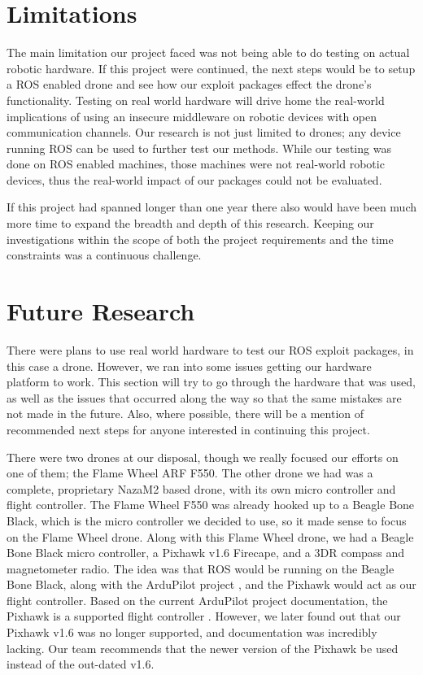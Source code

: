 \documentclass[IEEEtran,letterpaper,10pt,notitlepage,draftclsnofoot]{article}
\begin{document}
\section{Limitations}
The main limitation our project faced was not being able to do testing on actual robotic hardware.
If this project were continued, the next steps would be to setup a ROS enabled drone and see how our exploit packages effect the drone's functionality.
Testing on real world hardware will drive home the real-world implications of using an insecure middleware on robotic devices with open communication channels.
Our research is not just limited to drones; any device running ROS can be used to further test our methods.
While our testing was done on ROS enabled machines, those machines were not real-world robotic devices, thus the real-world impact of our packages could not be evaluated.

If this project had spanned longer than one year there also would have been much more time to expand the breadth and depth of this research.
Keeping our investigations within the scope of both the project requirements and the time constraints was a continuous challenge.

\section{Future Research}


There were plans to use real world hardware to test our ROS exploit packages, in this case a drone. However,
we ran into some issues getting our hardware platform to work. This section will try to go through the
hardware that was used, as well as the issues that occurred along the way so that the same mistakes are not
made in the future. Also, where possible, there will be a mention of recommended next steps for anyone
interested in continuing this project.

There were two drones at our disposal, though we really focused our efforts on one of them; the Flame Wheel ARF F550. The other drone we had was a complete, proprietary NazaM2 based drone, with its own micro controller
and flight controller. The Flame Wheel F550 was already hooked up to a Beagle Bone Black, which is the
micro controller we decided to use, so it made sense to focus on the Flame Wheel drone. Along with this
Flame Wheel drone, we had a Beagle Bone Black micro controller, a Pixhawk v1.6 Firecape, and a 3DR compass and
magnetometer radio. The idea was that ROS would be running on the Beagle Bone Black, along with the ArduPilot
project \cite{Ardu}, and the Pixhawk would act as our flight controller. Based on the current
ArduPilot project documentation, the Pixhawk is a supported flight controller \cite{ArduFlightController}.
However, we later found out that our Pixhawk v1.6 was no longer supported, and documentation was incredibly
lacking. Our team recommends that the newer version of the Pixhawk be used instead of the out-dated v1.6.
\end{document}
